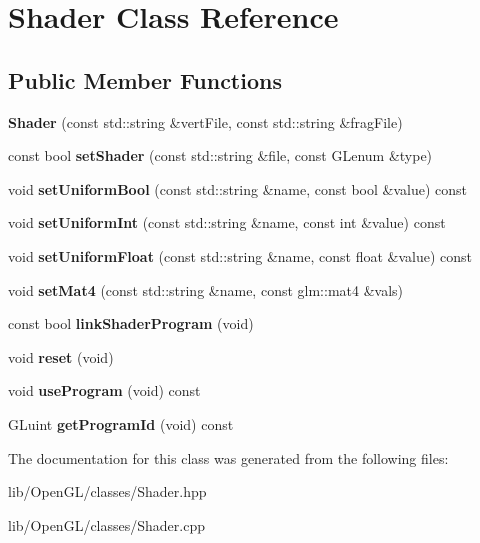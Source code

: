 \hypertarget{class_shader}{}\section{Shader Class Reference}
\label{class_shader}
\subsection*{Public Member Functions}
\begin{DoxyCompactItemize}
\item 
\mbox{\label{class_shader_a0a40ea1ce78aa2d3ea16e4be7374a341}} 
{\bfseries Shader} (const std\+::string \&vert\+File, const std\+::string \&frag\+File)
\item 
\mbox{\label{class_shader_a8c6d7a517434745f2a68f08c33747c76}} 
const bool {\bfseries set\+Shader} (const std\+::string \&file, const G\+Lenum \&type)
\item 
\mbox{\label{class_shader_a36f9ff713f9e50f4d09891d47dc3812c}} 
void {\bfseries set\+Uniform\+Bool} (const std\+::string \&name, const bool \&value) const
\item 
\mbox{\label{class_shader_af302034f8393f45d2f6957ac7f948689}} 
void {\bfseries set\+Uniform\+Int} (const std\+::string \&name, const int \&value) const
\item 
\mbox{\label{class_shader_a6036a5e3036bc7d6926f1d019b0cb489}} 
void {\bfseries set\+Uniform\+Float} (const std\+::string \&name, const float \&value) const
\item 
\mbox{\label{class_shader_a18d3289ec71bd0e1bf6b8b4f3776eb7e}} 
void {\bfseries set\+Mat4} (const std\+::string \&name, const glm\+::mat4 \&vals)
\item 
\mbox{\label{class_shader_a35543033bad31acc9104947b07c49ec1}} 
const bool {\bfseries link\+Shader\+Program} (void)
\item 
\mbox{\label{class_shader_aca3b1c42d29e6cc7225a49bc652063b0}} 
void {\bfseries reset} (void)
\item 
\mbox{\label{class_shader_a02e8d41d27aa2b4f229bc6ea681a6521}} 
void {\bfseries use\+Program} (void) const
\item 
\mbox{\label{class_shader_ab4dcb37eabe7c84587570a47206b0899}} 
G\+Luint {\bfseries get\+Program\+Id} (void) const
\end{DoxyCompactItemize}


The documentation for this class was generated from the following files\+:\begin{DoxyCompactItemize}
\item 
lib/\+Open\+G\+L/classes/Shader.\+hpp\item 
lib/\+Open\+G\+L/classes/Shader.\+cpp\end{DoxyCompactItemize}
